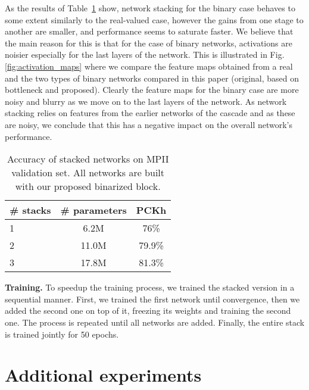 \documentclass[10pt,journal,compsoc]{IEEEtran}
\begin{document}
As the results of Table~\ref{tab:stacked_hg} show, network stacking  for the binary case behaves to some extent similarly to the real-valued case, however the gains from one stage to another are smaller, and performance seems to saturate faster. We believe that the main reason for this is that for the case of binary networks, activations are noisier especially for the last layers of the network. This is illustrated in Fig. \ref{fig:activation_maps} where we compare the feature maps obtained from a real and the two types of binary networks compared in this paper (original, based on bottleneck and proposed). Clearly the feature maps for the binary case are more noisy and blurry as we move on to the last layers of the network. As network stacking relies on features from the earlier networks of the cascade and as these are noisy, we conclude that this has a negative impact on the overall network's performance.   

\begin{table}[!htbp]
    \renewcommand{\arraystretch}{1.3}
    \caption{Accuracy of stacked networks on MPII validation set. All networks are built with our proposed binarized block.}
    \label{tab:stacked_hg}
    \centering
    \begin{tabular}{|l|c|c|}
        \hline
        \# stacks   & \# parameters & PCKh            \\
        \hline\hline
        1                & 6.2M          & 76\%            \\
        \hline
        2 & 11.0M & 79.9\% \\
        \hline
        3 & 17.8M & 81.3\% \\
        \hline
    \end{tabular}
\end{table}

\textbf{Training.} To speedup the training process, we trained the stacked version in a sequential manner. First, we trained the first network until convergence, then we added the second one on top of it, freezing its weights and training the second one. The process is repeated until all networks are added. Finally, the entire stack is trained jointly for 50 epochs. 

\section{Additional experiments}\label{sec:additional-experiments}
\end{document}
